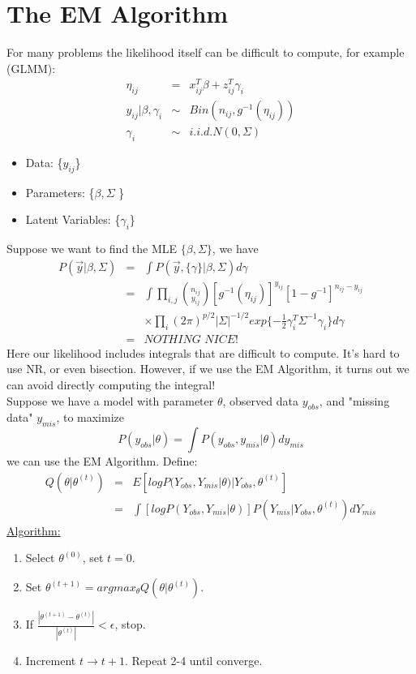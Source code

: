\documentclass[12pt,a4paper]{article}
\begin{document}
\section{The EM Algorithm}
For many problems the likelihood itself can be difficult to compute, for example (GLMM):
\begin{eqnarray}
\eta_{ij} &=& x_{ij}^T\beta + z_{ij}^T\gamma_i \nonumber \\
y_{ij}|\beta, \gamma_i &\sim& Bin(n_{ij},g^{-1}(\eta_{ij})) \nonumber \\
\gamma_i &\sim&i.i.d. N(0,\Sigma) \nonumber
\end{eqnarray}
\begin{itemize}
\item Data: \{$y_{ij}$\}
\item Parameters: \{$\beta, \Sigma$ \}
\item Latent Variables: \{$\gamma_i$\}
\end{itemize}
Suppose we want to find the MLE $\{\beta, \Sigma \}$, we have 
\begin{eqnarray}
P(\overrightarrow{y}|\beta, \Sigma) &=& \int P(\overrightarrow{y}, \{\gamma\}|\beta, \Sigma) d\gamma \nonumber \\
&=& \int \prod_{i,j} \binom{n_{ij}}{y_{ij}}[g^{-1}(\eta_{ij})]^{y_{ij}}[1-g^{-1}]^{n_{ij}-y_{ij}} \nonumber \\
&& \times \prod_i (2\pi)^{p/2}|\Sigma|^{-1/2}exp\{-\frac{1}{2}\gamma_i^T \Sigma^{-1} \gamma_i\}d\gamma \nonumber\\
&=& \textit{NOTHING NICE!} \nonumber
\end{eqnarray}
Here our likelihood includes integrals that are difficult to compute. It's hard to use NR, or even bisection. However, if we use the EM Algorithm, it turns out we can avoid directly computing the integral!\\

\noindent Suppose we have a model with parameter $\theta$, observed data $y_{obs}$, and "missing data" $y_{mis}$, to maximize 
\[
P(y_{obs}|\theta) = \int P(y_{obs}, y_{mis} |\theta)dy_{mis}
\]
we can use the EM Algorithm. Define: 
\begin{eqnarray}
Q(\theta | \theta^{(t)}) &=& E[log P(Y_{obs},Y_{mis}|\theta)|Y_{obs},\theta^{(t)}] \nonumber \\
&=& \int [log P(Y_{obs},Y_{mis}|\theta)]P(Y_{mis}|Y_{obs},\theta^{(t)})dY_{mis} \nonumber
\end{eqnarray}
\newpage
\underline{Algorithm:}
\begin{enumerate}
\item Select $\theta^{(0)}$, set $t=0$.
\item Set $\theta^{(t+1)} = argmax_{\theta} Q(\theta | \theta^{(t)})$.
\item If $\frac{|\theta^{(t+1)}-\theta^{(t)}|}{|\theta^{(t)}|} < \epsilon$, stop.
\item Increment $t \rightarrow t+1$. Repeat 2-4 until converge.
\end{enumerate}
\end{document}
